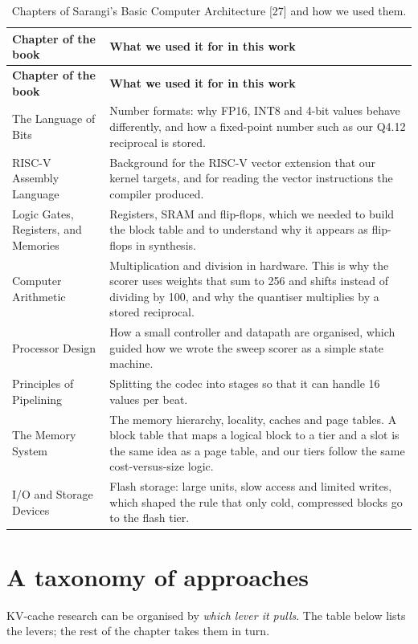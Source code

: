 \documentclass[12pt,a4paper]{report}
\begin{document}
{\fontsize{9}{10.5}\selectfont\setlength{\tabcolsep}{3pt}
\begin{longtable}{>{\raggedright\arraybackslash}p{1.70in}>{\raggedright\arraybackslash}p{4.36in}}
\caption{Chapters of Sarangi's Basic Computer Architecture [27] and how we used them.}\\
\toprule
\textbf{Chapter of the book} & \textbf{What we used it for in this work} \\\midrule\endfirsthead
\toprule \textbf{Chapter of the book} & \textbf{What we used it for in this work} \\\midrule\endhead
\bottomrule\endfoot
The Language of Bits & Number formats: why FP16, INT8 and 4-bit values behave differently, and how a fixed-point number such as our Q4.12 reciprocal is stored. \\
RISC-V Assembly Language & Background for the RISC-V vector extension that our kernel targets, and for reading the vector instructions the compiler produced. \\
Logic Gates, Registers, and Memories & Registers, SRAM and flip-flops, which we needed to build the block table and to understand why it appears as flip-flops in synthesis. \\
Computer Arithmetic & Multiplication and division in hardware. This is why the scorer uses weights that sum to 256 and shifts instead of dividing by 100, and why the quantiser multiplies by a stored reciprocal. \\
Processor Design & How a small controller and datapath are organised, which guided how we wrote the sweep scorer as a simple state machine. \\
Principles of Pipelining & Splitting the codec into stages so that it can handle 16 values per beat. \\
The Memory System & The memory hierarchy, locality, caches and page tables. A block table that maps a logical block to a tier and a slot is the same idea as a page table, and our tiers follow the same cost-versus-size logic. \\
I/O and Storage Devices & Flash storage: large units, slow access and limited writes, which shaped the rule that only cold, compressed blocks go to the flash tier. \\
\bottomrule
\end{longtable}}
\section{A taxonomy of approaches}\label{sec:2_1}
KV-cache research can be organised by \textit{which lever it pulls}. The table below lists the levers; the rest of the chapter takes them in turn.
\end{document}
